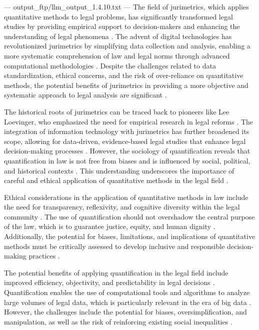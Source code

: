 ---
output_ftp/llm_output_1.4.10.txt
---
The field of jurimetrics, which applies quantitative methods to legal problems, has significantly transformed legal studies by providing empirical support to decision-makers and enhancing the understanding of legal phenomena \cite{10.1007/s11186-021-09453-1,10.3390/fi9040068}. The advent of digital technologies has revolutionized jurimetrics by simplifying data collection and analysis, enabling a more systematic comprehension of law and legal norms through advanced computational methodologies \cite{10.1007/s11186-021-09453-1,unger2021process}. Despite the challenges related to data standardization, ethical concerns, and the risk of over-reliance on quantitative methods, the potential benefits of jurimetrics in providing a more objective and systematic approach to legal analysis are significant \cite{jurimetricschallenges}.

The historical roots of jurimetrics can be traced back to pioneers like Lee Loevinger, who emphasized the need for empirical research in legal reforms \cite{loevinger1959}. The integration of information technology with jurimetrics has further broadened its scope, allowing for data-driven, evidence-based legal studies that enhance legal decision-making processes \cite{10.1007/s11186-021-09453-1,unger2021process}. However, the sociology of quantification reveals that quantification in law is not free from biases and is influenced by social, political, and historical contexts \cite{10.1590/data.2022.65.3.267,10.1007/978-3-319-44000-2_15}. This understanding underscores the importance of careful and ethical application of quantitative methods in the legal field \cite{smith2021}.

Ethical considerations in the application of quantitative methods in law include the need for transparency, reflexivity, and cognitive diversity within the legal community \cite{silva2023role,nunes2016jurimetria}. The use of quantification should not overshadow the central purpose of the law, which is to guarantee justice, equity, and human dignity \cite{silva2023role,nunes2016jurimetria}. Additionally, the potential for biases, limitations, and implications of quantitative methods must be critically assessed to develop inclusive and responsible decision-making practices \cite{silva2023role,nunes2016jurimetria}.

The potential benefits of applying quantification in the legal field include improved efficiency, objectivity, and predictability in legal decisions \cite{silva2023role,nunes2016jurimetria}. Quantification enables the use of computational tools and algorithms to analyze large volumes of legal data, which is particularly relevant in the era of big data \cite{silva2023role,nunes2016jurimetria}. However, the challenges include the potential for biases, oversimplification, and manipulation, as well as the risk of reinforcing existing social inequalities \cite{silva2023role,nunes2016jurimetria}.

